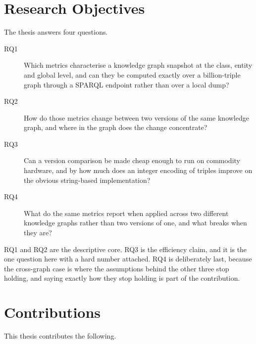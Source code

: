 \section{Research Objectives}
\label{sec:research_objectives}

The thesis answers four questions.

\begin{description}
  \item[RQ1] Which metrics characterise a knowledge graph snapshot at the class,
    entity and global level, and can they be computed exactly over a
    billion-triple graph through a SPARQL endpoint rather than over a local
    dump?
  \item[RQ2] How do those metrics change between two versions of the same
    knowledge graph, and where in the graph does the change concentrate?
  \item[RQ3] Can a version comparison be made cheap enough to run on commodity
    hardware, and by how much does an integer encoding of triples improve on the
    obvious string-based implementation?
  \item[RQ4] What do the same metrics report when applied across two different
    knowledge graphs rather than two versions of one, and what breaks when they
    are?
\end{description}

RQ1 and RQ2 are the descriptive core. RQ3 is the efficiency claim, and it is the
one question here with a hard number attached. RQ4 is deliberately last, because
the cross-graph case is where the assumptions behind the other three stop
holding, and saying exactly how they stop holding is part of the contribution.

\section{Contributions}
\label{sec:contributions}

This thesis contributes the following.

